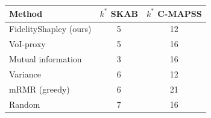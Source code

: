 \begin{tabular}{@{}lcc@{}}
\toprule
Method & $k^{*}$ SKAB & $k^{*}$ C-MAPSS \\
\midrule
FidelityShapley (ours) & 5 & 12 \\
VoI-proxy & 5 & 16 \\
Mutual information & 3 & 16 \\
Variance & 6 & 12 \\
mRMR (greedy) & 6 & 21 \\
Random & 7 & 16 \\
\bottomrule
\end{tabular}